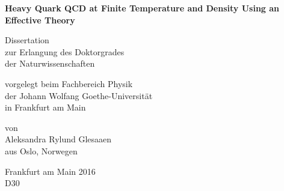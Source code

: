 \begin{titlepage}
  \vspace*{\fill}

  \begin{center} \sffamily\Huge\bfseries
    Heavy Quark QCD at Finite Temperature and Density Using an Effective Theory
  \end{center}

  \vspace*{1cm}

  \begin{center} \sffamily\large
    Dissertation\\
    zur Erlangung des Doktorgrades\\
    der Naturwissenschaften
  \end{center}

  \vspace*{1cm}

  \begin{center} \sffamily\large
    vorgelegt beim Fachbereich Physik\\
    der Johann Wolfang Goethe-Universit\"at\\
    in Frankfurt am Main
  \end{center}

  \vspace*{1cm}

  \begin{center} \sffamily\large
    von\\
    Aleksandra Rylund Glesaaen\\
    aus Oslo, Norwegen
  \end{center}

  \vspace*{1cm}

  \begin{center} \sffamily\large
    Frankfurt am Main 2016\\
    D30
  \end{center}

  \vspace*{\fill}
\end{titlepage}

